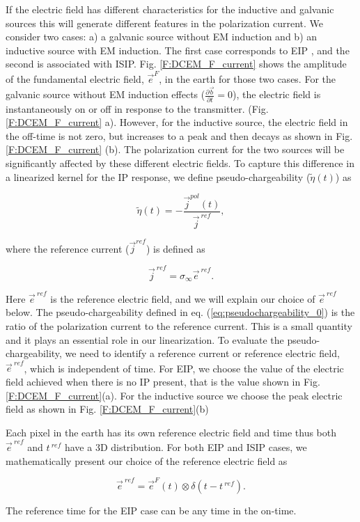 \documentclass[extra,mreferee]{gji}
\newcommand{\siginf}{\sigma_\infty}
\renewcommand {\j}  { {\vec j} }
\renewcommand {\b}  { {\vec b} }
\newcommand {\e}  { {\vec e} }
\newcommand{\peta}{\tilde{\eta}}
\newcommand{\eref}{\e^{\ ref}}
\begin{document}
If the electric field has different characteristics for the inductive and galvanic sources this will generate different features in the polarization current.
We consider two cases: a) a galvanic source without EM induction and b) an inductive source with EM induction. The first case corresponds to EIP \cite[]{seigel1959}, and the second is associated with ISIP.
Fig. \ref{F:DCEM_F_current} shows the amplitude of the fundamental electric field, $\e^{F}$, in the earth for those two cases.
For the galvanic source without EM induction effects ($\frac{\partial \b}{\partial t}=0$), the electric field is instantaneously on or off in response to the transmitter. (Fig. \ref{F:DCEM_F_current} a).
However, for the inductive source, the electric field in the off-time is not zero, but increases to a peak and then decays as shown in Fig. \ref{F:DCEM_F_current} (b).
The polarization current for the two sources will be significantly affected by these different electric fields.
To capture this difference in a linearized kernel for the IP response, we define pseudo-chargeability ($\peta(t)$) as
\begin{linenomath*}
\begin{equation}
  \peta(t) = -\frac{\j^{pol}(t)}{\j^{\ ref}},
  \label{eq:pseudochargeability_0}
\end{equation}
\end{linenomath*}
where the reference current ($\j^{ref}$) is defined as
\begin{linenomath*}
\begin{equation}
  \j^{\ ref} = \siginf \eref.
  \label{eq:reference_current}
\end{equation}
\end{linenomath*}
Here $\eref$ is the reference electric field, and we will explain our choice of $\eref$ below.
The pseudo-chargeability defined in eq. (\ref{eq:pseudochargeability_0})  is the ratio of  the polarization current to the reference current. This is a small quantity and it plays an essential role in our linearization.
To evaluate the pseudo-chargeability, we need to identify a reference current or reference electric field, $\eref$, which is independent of time. For EIP, we choose the value of the electric field achieved when there is no IP present, that is the value shown  in Fig. \ref{F:DCEM_F_current}(a). For the inductive source  we choose the peak electric field as shown in Fig. \ref{F:DCEM_F_current}(b)

Each pixel in the earth has its own reference electric field and time thus  both $\eref$ and $t^{\ ref}$ have a 3D distribution.
For both EIP and ISIP cases, we mathematically present our choice of the reference electric field as
\begin{linenomath*}
\begin{equation}
  \eref = \e^{F}(t) \otimes \delta(t-t^{\ ref}).
  \label{eq:reference_electricfield}
\end{equation}
\end{linenomath*}
The reference time for the EIP case can be any time in the on-time.
\end{document}

